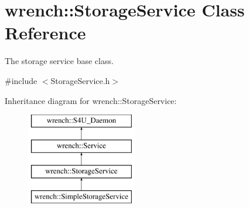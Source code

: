 \hypertarget{classwrench_1_1_storage_service}{}\section{wrench\+:\+:Storage\+Service Class Reference}
\label{classwrench_1_1_storage_service}


The storage service base class.  




{\ttfamily \#include $<$Storage\+Service.\+h$>$}

Inheritance diagram for wrench\+:\+:Storage\+Service\+:\begin{figure}[H]
\begin{center}
\leavevmode
\includegraphics[height=4.000000cm]{classwrench_1_1_storage_service}
\end{center}
\end{figure}
